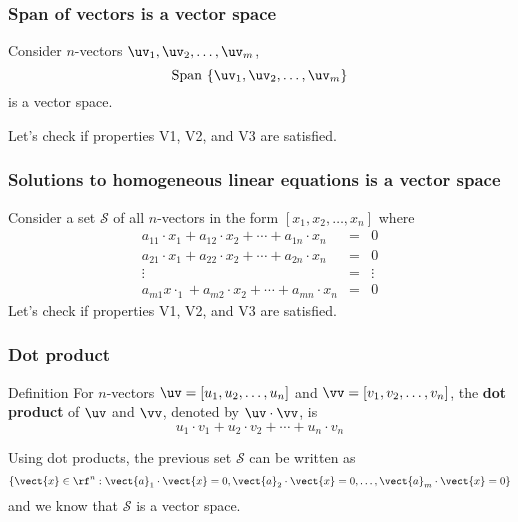 \begin{frame}
  \frametitle{Span of vectors is a vector space}
  Consider $n$-vectors $\uv_1,\uv_2,\ldots,\uv_m$,
  \[
  \mathrm{Span}\ \{\uv_1,\uv_2,\ldots,\uv_m\}
  \]
  is a vector space.

  \pause
  \vspace{0.2in}
  Let's check if properties V1, V2, and V3 are satisfied.
  \vspace{1.5in}
\end{frame}

\begin{frame}
  \frametitle{Solutions to homogeneous linear equations is a vector space}
  Consider a set ${\mathcal S}$ of all $n$-vectors in the form $[x_1,x_2,\ldots,x_n]$ where
  \[
  \begin{array}{rcl}
    a_{11}\cdot x_1 + a_{12}\cdot x_2 + \cdots + a_{1n}\cdot x_n &=& 0 \\
    a_{21}\cdot x_1 + a_{22}\cdot x_2 + \cdots + a_{2n}\cdot x_n &=& 0 \\
    \vdots &=& \vdots \\
    a_{m1}x\cdot _1 + a_{m2}\cdot x_2 + \cdots + a_{mn}\cdot x_n &=& 0
  \end{array}
  \]
  \vspace{0.2in}
  Let's check if properties V1, V2, and V3 are satisfied.
  \vspace{1.5in}
  
\end{frame}

\begin{frame}
  \frametitle{Dot product}

  \begin{block}{Definition}
    For $n$-vectors $\uv=[u_1,u_2,\ldots,u_n]$ and $\vv=[v_1,v_2,\ldots,v_n]$, the {\bf dot product} of $\uv$ and $\vv$, denoted by $\uv\cdot\vv$, is
    \[
    u_1\cdot v_1 + 
    u_2\cdot v_2 +
    \cdots +
    u_n\cdot v_n 
    \]
  \end{block}

  \vspace{0.2in}
  \pause
  Using dot products, the previous set $\mathcal S$ can be written as
  \[
  \{ \vect{x}\in \rf^n :
  \vect{a}_1\cdot \vect{x} = 0,
  \vect{a}_2\cdot \vect{x} = 0,\ldots,
  \vect{a}_m\cdot \vect{x} = 0
  \}
  \]
  and we know that $\mathcal S$ is a vector space.
\end{frame}

